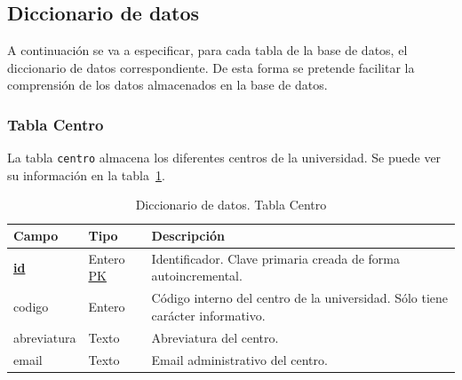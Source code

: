 \subsection{Diccionario de datos}
A continuación se va a especificar, para cada tabla de la base de datos, el diccionario de datos correspondiente.
De esta forma se pretende facilitar la comprensión de los datos almacenados en la base de datos.
\subsubsection{Tabla Centro}
La tabla \texttt{centro} almacena los diferentes centros de la universidad. 
Se puede ver su información en la tabla~\ref{tab:diccionario_centro}.
\begin{table}
\centering
  \begin{tabular}{l p{} p{}}
    \toprule
    \textbf{Campo} & \textbf{Tipo} & \textbf{Descripción}\\
    \midrule
    \textbf{\underline{id}} & Entero \underline{PK} & Identificador. Clave primaria creada de forma autoincremental. \\ \addlinespace
    codigo & Entero & Código interno del centro de la universidad. Sólo tiene carácter informativo. \\ \addlinespace 
    abreviatura & Texto & Abreviatura del centro. \\ \addlinespace
    email & Texto & Email administrativo del centro. \\
    \bottomrule
  \end{tabular}
  \caption{Diccionario de datos. Tabla Centro}
  \label{tab:diccionario_centro}
\end{table}

